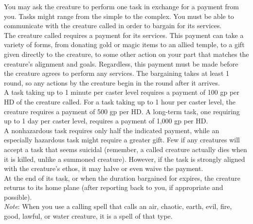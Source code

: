 You may ask the creature to perform one task in exchange for a payment from you. Tasks might range from the simple to the complex. You must be able to communicate with the creature called in order to bargain for its services.\\
The creature called requires a payment for its services. This payment can take a variety of forms, from donating gold or magic items to an allied temple, to a gift given directly to the creature, to some other action on your part that matches the creature's alignment and goals. Regardless, this payment must be made before the creature agrees to perform any services. The bargaining takes at least 1 round, so any actions by the creature begin in the round after it arrives.\\
A task taking up to 1 minute per caster level requires a payment of 100 gp per HD of the creature called. For a task taking up to 1 hour per caster level, the creature requires a payment of 500 gp per HD. A long-term task, one requiring up to 1 day per caster level, requires a payment of 1,000 gp per HD.\\
A nonhazardous task requires only half the indicated payment, while an especially hazardous task might require a greater gift. Few if any creatures will accept a task that seems suicidal (remember, a called creature actually dies when it is killed, unlike a summoned creature). However, if the task is strongly aligned with the creature's ethos, it may halve or even waive the payment. \\
At the end of its task, or when the duration bargained for expires, the creature returns to its home plane (after reporting back to you, if appropriate and possible).\\
\textit{Note}: When you use a calling spell that calls an air, chaotic, earth, evil, fire, good, lawful, or water creature, it is a spell of that type.\\
